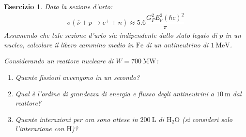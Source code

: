 \documentclass[10pt, a4paper]{article}
\newcommand*\chem[1]{\ensuremath{\mathrm{#1}}}
\theoremstyle{plain}
\newtheorem{ese}{Esercizio}
\begin{document}
	\begin{ese}
		Data la sezione d'urto:
		\begin{gather}
		\label{eqn:sigmanu}
		\sigma(\overline{\nu}+p\to e^++n)\approx5.6\dfrac{G_{F}^2E_{\nu}^{2}\left(\hbar c\right)^2}{\pi}
		\end{gather}
		Assumendo che tale sezione d'urto sia indipendente dallo stato legato di $ p $ in un nucleo, calcolare il libero cammino medio in $ \chem{Fe} $ di un antineutrino di $ \SI{1}{\mega\electronvolt} $.
		
		Considerando un reattore nucleare di $ W=\SI{700}{\mega\watt} $:
		\begin{enumerate}
		\item Quante fissioni avvengono in un secondo?
		\item Qual è l'ordine di grandezza di energia e flusso degli antineutrini a $ \SI{10}{\meter} $ dal reattore?
		\item Quante interazioni per ora sono attese in $ \SI{200}{\liter} $ di $ \chem{H_2O} $ (si consideri solo l'interazione con $ \chem{H} $)?
		\end{enumerate}
	\end{ese}
\end{document}
